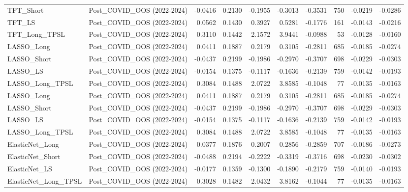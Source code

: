 \begin{tabular}{llrrrrrrrr}
\cline{1-10}
TFT\_Short & Post\_COVID\_OOS (2022-2024) & -0.0416 & 0.2130 & -0.1955 & -0.3013 & -0.3531 & 750 & -0.0219 & -0.0286 \\
\cline{1-10}
TFT\_LS & Post\_COVID\_OOS (2022-2024) & 0.0562 & 0.1430 & 0.3927 & 0.5281 & -0.1776 & 161 & -0.0143 & -0.0216 \\
\cline{1-10}
TFT\_Long\_TPSL & Post\_COVID\_OOS (2022-2024) & 0.3110 & 0.1442 & 2.1572 & 3.9441 & -0.0988 & 53 & -0.0128 & -0.0160 \\
\cline{1-10}
LASSO\_Long & Post\_COVID\_OOS (2022-2024) & 0.0411 & 0.1887 & 0.2179 & 0.3105 & -0.2811 & 685 & -0.0185 & -0.0274 \\
\cline{1-10}
LASSO\_Short & Post\_COVID\_OOS (2022-2024) & -0.0437 & 0.2199 & -0.1986 & -0.2970 & -0.3707 & 698 & -0.0229 & -0.0303 \\
\cline{1-10}
LASSO\_LS & Post\_COVID\_OOS (2022-2024) & -0.0154 & 0.1375 & -0.1117 & -0.1636 & -0.2139 & 759 & -0.0142 & -0.0193 \\
\cline{1-10}
LASSO\_Long\_TPSL & Post\_COVID\_OOS (2022-2024) & 0.3084 & 0.1488 & 2.0722 & 3.8585 & -0.1048 & 77 & -0.0135 & -0.0163 \\
\cline{1-10}
LASSO\_Long & Post\_COVID\_OOS (2022-2024) & 0.0411 & 0.1887 & 0.2179 & 0.3105 & -0.2811 & 685 & -0.0185 & -0.0274 \\
\cline{1-10}
LASSO\_Short & Post\_COVID\_OOS (2022-2024) & -0.0437 & 0.2199 & -0.1986 & -0.2970 & -0.3707 & 698 & -0.0229 & -0.0303 \\
\cline{1-10}
LASSO\_LS & Post\_COVID\_OOS (2022-2024) & -0.0154 & 0.1375 & -0.1117 & -0.1636 & -0.2139 & 759 & -0.0142 & -0.0193 \\
\cline{1-10}
LASSO\_Long\_TPSL & Post\_COVID\_OOS (2022-2024) & 0.3084 & 0.1488 & 2.0722 & 3.8585 & -0.1048 & 77 & -0.0135 & -0.0163 \\
\cline{1-10}
ElasticNet\_Long & Post\_COVID\_OOS (2022-2024) & 0.0377 & 0.1876 & 0.2007 & 0.2856 & -0.2859 & 707 & -0.0186 & -0.0273 \\
\cline{1-10}
ElasticNet\_Short & Post\_COVID\_OOS (2022-2024) & -0.0488 & 0.2194 & -0.2222 & -0.3319 & -0.3716 & 698 & -0.0230 & -0.0302 \\
\cline{1-10}
ElasticNet\_LS & Post\_COVID\_OOS (2022-2024) & -0.0177 & 0.1359 & -0.1300 & -0.1890 & -0.2179 & 759 & -0.0140 & -0.0193 \\
\cline{1-10}
ElasticNet\_Long\_TPSL & Post\_COVID\_OOS (2022-2024) & 0.3028 & 0.1482 & 2.0432 & 3.8162 & -0.1044 & 77 & -0.0135 & -0.0163 \\

\end{tabular}
